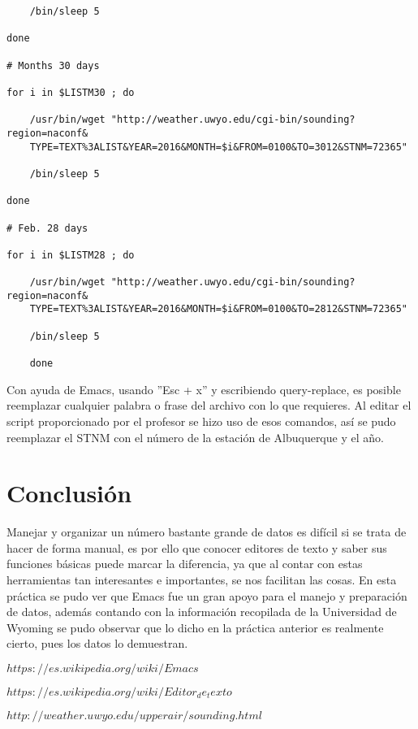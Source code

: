 \documentclass[12pt]{article}
\begin{document}
\begin{doublespace}
\begin{verbatim}
    /bin/sleep 5

done

# Months 30 days

for i in $LISTM30 ; do

    /usr/bin/wget "http://weather.uwyo.edu/cgi-bin/sounding?region=naconf&
    TYPE=TEXT%3ALIST&YEAR=2016&MONTH=$i&FROM=0100&TO=3012&STNM=72365"

    /bin/sleep 5

done

# Feb. 28 days

for i in $LISTM28 ; do

    /usr/bin/wget "http://weather.uwyo.edu/cgi-bin/sounding?region=naconf&
    TYPE=TEXT%3ALIST&YEAR=2016&MONTH=$i&FROM=0100&TO=2812&STNM=72365"

    /bin/sleep 5

    done
\end{verbatim}

Con ayuda de Emacs, usando ''Esc + x'' y escribiendo query-replace, es posible reemplazar cualquier palabra o frase del archivo con lo que requieres. Al editar el script proporcionado por el profesor se hizo uso de esos comandos, así se pudo reemplazar el STNM con el número de la estación de Albuquerque y el año.

\section{Conclusión}
Manejar y organizar un número bastante grande de datos es difícil si se trata de hacer de forma manual, es por ello que conocer editores de texto y saber sus funciones básicas puede marcar la diferencia, ya que al contar con estas herramientas tan interesantes e importantes, se nos facilitan las cosas. En esta práctica se pudo ver que Emacs fue un gran apoyo para el manejo y preparación de datos, además contando con la información recopilada de la Universidad de Wyoming se pudo observar que lo dicho en la práctica anterior es realmente cierto, pues los datos lo demuestran.

\newpage
\renewcommand{\refname}{\section{Referencias}}
\begin{thebibliography}{9}
 \textsc{$https://es.wikipedia.org/wiki/Emacs$}

 \textsc{$https://es.wikipedia.org/wiki/Editor_de_texto$}

 \textsc{$http://weather.uwyo.edu/upperair/sounding.html$}
\end{thebibliography}

\end{doublespace}
\end{document}
